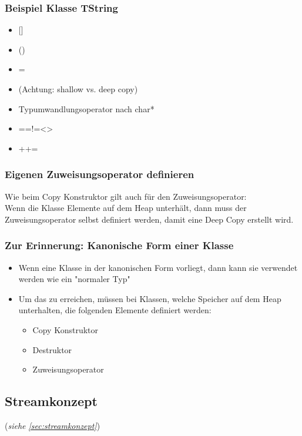 \subsubsection{Beispiel Klasse TString}
\begin{itemize}
	\item{} []
	\item{} ()
	\item{} =
	\item[\-] (Achtung: shallow vs. deep copy)
	\item Typumwandlungsoperator nach char*
	\item{} ==\quad!=\quad<\quad>
	\item{} +\quad+=
\end{itemize}

\subsubsection{Eigenen Zuweisungsoperator definieren}
Wie beim Copy Konstruktor gilt auch für den Zuweisungsoperator:\\
Wenn die Klasse Elemente auf dem Heap unterhält, dann muss der Zuweisungsoperator selbst definiert werden, damit eine Deep Copy erstellt wird.

\subsubsection{Zur Erinnerung: Kanonische Form einer Klasse}
\begin{itemize}
	\item Wenn eine Klasse in der kanonischen Form vorliegt, dann kann sie verwendet werden wie ein "normaler Typ"
	\item Um das zu erreichen, müssen bei Klassen, welche Speicher auf dem Heap unterhalten, die folgenden Elemente definiert werden:
	\begin{itemize}
		\item Copy Konstruktor
		\item Destruktor
		\item Zuweisungsoperator
	\end{itemize}
\end{itemize}

\subsection{Streamkonzept}
\label{sec:streamkonzeptOverloading}
(\emph{siehe \ref{sec:streamkonzept}})

